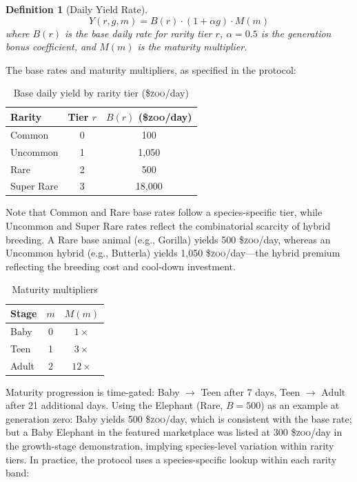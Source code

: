\documentclass[11pt,letterpaper]{article}
\newtheorem{definition}{Definition}[section]
\newcommand{\ZOO}{\$\textsc{zoo}}
\begin{document}
\begin{definition}[Daily Yield Rate]
\begin{equation}
Y(r, g, m) = B(r) \cdot (1 + \alpha g) \cdot M(m)
\label{eq:yield}
\end{equation}
where $B(r)$ is the base daily rate for rarity tier $r$, $\alpha = 0.5$ is the generation
bonus coefficient, and $M(m)$ is the maturity multiplier.
\end{definition}

The base rates and maturity multipliers, as specified in the protocol:

\begin{table}[ht]
\centering
\caption{Base daily yield by rarity tier (\ZOO{}/day)}
\label{tab:base_yield}
\begin{tabular}{lcc}
\toprule
Rarity & Tier $r$ & $B(r)$ (\ZOO{}/day) \\
\midrule
Common     & 0 & 100 \\
Uncommon   & 1 & 1{,}050 \\
Rare       & 2 & 500 \\
Super Rare & 3 & 18{,}000 \\
\bottomrule
\end{tabular}
\end{table}

Note that Common and Rare base rates follow a species-specific tier, while Uncommon
and Super Rare rates reflect the combinatorial scarcity of hybrid breeding.  A Rare
base animal (e.g., Gorilla) yields 500 \ZOO{}/day, whereas an Uncommon hybrid
(e.g., Butterla) yields 1,050 \ZOO{}/day---the hybrid premium reflecting the breeding
cost and cool-down investment.

\begin{table}[ht]
\centering
\caption{Maturity multipliers}
\label{tab:maturity}
\begin{tabular}{lcc}
\toprule
Stage & $m$ & $M(m)$ \\
\midrule
Baby  & 0 & $1\times$ \\
Teen  & 1 & $3\times$ \\
Adult & 2 & $12\times$ \\
\bottomrule
\end{tabular}
\end{table}

Maturity progression is time-gated: Baby $\to$ Teen after 7 days, Teen $\to$ Adult after
21 additional days.  Using the Elephant (Rare, $B = 500$) as an example at generation zero:
Baby yields 500 \ZOO{}/day, which is consistent with the base rate; but a Baby Elephant
in the featured marketplace was listed at 300 \ZOO{}/day in the growth-stage demonstration,
implying species-level variation within rarity tiers.  In practice, the protocol uses a
species-specific lookup within each rarity band:
\end{document}
